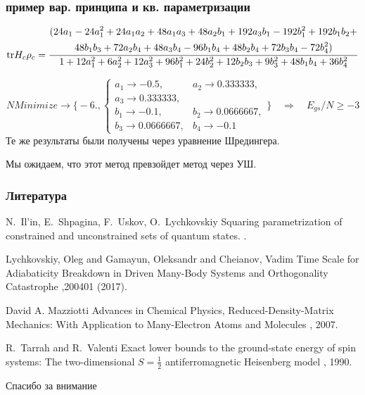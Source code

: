\documentclass{beamer}
\begin{document}
\begin{frame}
\frametitle{пример вар. принципа и кв. параметризации}
\small
$$\mathrm{tr} H_c\rho_c = \frac{\begin{gathered}(
24 a_1 - 24 a_1^2 + 24 a_1 a_2 + 48 a_1 a_3 + 48 a_2 b_1 + 192 a_3 b_1 - 192 b_1^2 + 192 b_1 b_2 + \\
48 b_1 b_3 + 72 a_2 b_4 + 48 a_3 b_4 - 96 b_1 b_4 + 48 b_2 b_4 + 72 b_3 b_4 - 72 b_4^2)\end{gathered}}
{1 + 12 a_1^2 + 6 a_2^2 + 12 a_3^2 + 96 b_1^2 + 24 b_2^2 + 12 b_2 b_3 + 9 b_3^2 + 48 b_1 b_4 + 36 b_4^2}$$

$$NMinimize\rightarrow\Bigg\{-6., \begin{cases}
a_1 \rightarrow -0.5,&a_2 \rightarrow 0.333333, \\a_3 \rightarrow 0.333333, \\
b_1 \rightarrow -0.1,&b_2 \rightarrow 0.0666667,\\
b_3 \rightarrow 0.0666667, &b_4 \rightarrow -0.1
\end{cases}\Bigg\} \quad\Rightarrow\quad
E_{gs}/N\geqslant -3
$$
\normalsize
Те же результаты были получены через уравнение Шредингера.

Мы ожидаем, что этот метод превзойдет метод через УШ.

\end{frame}


\begin{frame}
\frametitle{Литература}
\footnotesize{
\begin{thebibliography}{99}

N.~Il'in, E.~Shpagina, F.~Uskov, O.~Lychkovskiy
\newblock Squaring parametrization of constrained and
  unconstrained sets of quantum states.
.

Lychkovskiy, Oleg and Gamayun, Oleksandr and Cheianov, Vadim
\newblock Time Scale for Adiabaticity Breakdown in Driven Many-Body Systems and Orthogonality Catastrophe
,200401 (2017).

David A. Mazziotti
\newblock Advances in Chemical Physics, Reduced-Density-Matrix Mechanics: With Application to Many-Electron Atoms and Molecules
, 2007.

R.~Tarrah and R.~Valenti
\newblock Exact lower bounds to the ground-state energy of spin systems: The two-dimensional $S=\frac12$ antiferromagnetic Heisenberg model
, 1990.

\end{thebibliography}
}
\end{frame}


\begin{frame}
\Huge{\centerline{Спасибо за внимание}}
\end{frame}

\end{document}
